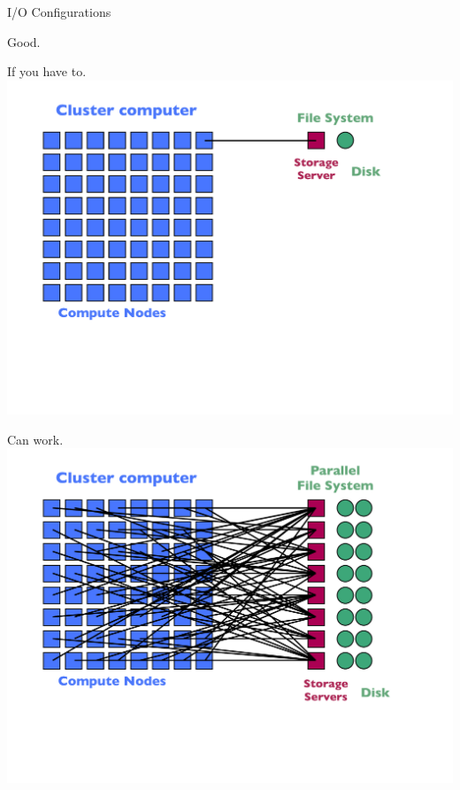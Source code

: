 \begin{frame}{I/O Configurations}
\begin{minipage}{0.32\textwidth}
\begin{block}{Good.}
    \end{block}
  \end{minipage}\hspace{1ex}
  \begin{minipage}{0.32\textwidth}
    \begin{block}{If you have to.}
      \includegraphics[trim=0 120 30 40,clip,width=1\textwidth]{../common/pics/hardware/ParallelHardware15.pdf}
    \end{block}
  \end{minipage}
  \begin{minipage}{0.32\textwidth}
    \begin{block}{Can work.}
      \includegraphics[trim=0 120 30 40,clip,width=1\textwidth]{../common/pics/hardware/ParallelHardware18.pdf}

\end{block}
\end{minipage}
\end{frame}
